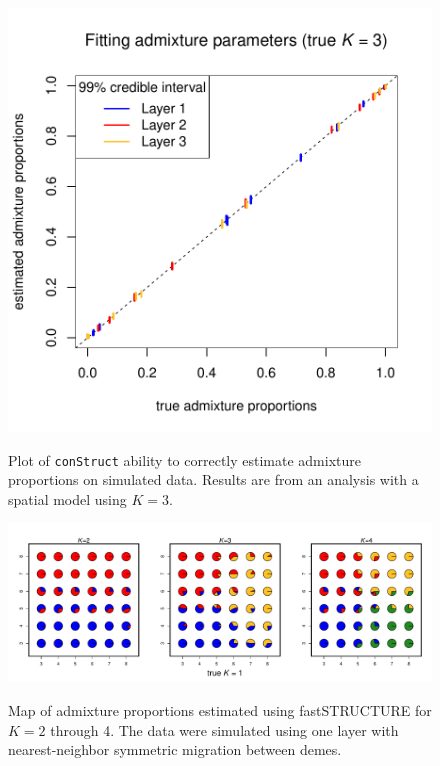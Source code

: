 \documentclass[10pt,letterpaper]{article}
\begin{document}
\begin{figure}
	\centering
		{\includegraphics[width=\textwidth]{figs/sims/simK3_adprop_fit.pdf}}
		\caption{
			Plot of \texttt{conStruct} ability to correctly estimate admixture proportions on simulated data.
			Results are from an analysis with a spatial model using $K=3$.
		}\label{simK3_adprop_fit}
\end{figure}
\clearpage

\begin{figure}
	\centering
		{\includegraphics[width=\textwidth]{figs/fastStr/fastStr_simK1_pies.pdf}}
	\caption{
	Map of admixture proportions estimated using fastSTRUCTURE \cite{fastStructure} for $K=2$ through 4.
	The data were simulated using one layer with nearest-neighbor symmetric migration between demes.
    }\label{fastStr_simK1}
\end{figure}
\clearpage
\end{document}
